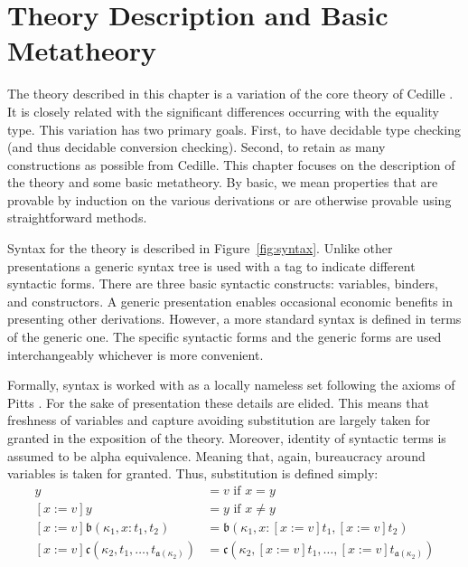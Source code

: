 \chapter{Theory Description and Basic Metatheory}



The theory described in this chapter is a variation of the core theory of Cedille \cite{stump2021_cedillecore}.
It is closely related with the significant differences occurring with the equality type.
This variation has two primary goals.
First, to have decidable type checking (and thus decidable conversion checking).
Second, to retain as many constructions as possible from Cedille.
This chapter focuses on the description of the theory and some basic metatheory.
By basic, we mean properties that are provable by induction on the various derivations or are otherwise provable using straightforward methods.

Syntax for the theory is described in Figure~\ref{fig:syntax}.
Unlike other presentations a generic syntax tree is used with a tag to indicate different syntactic forms.
There are three basic syntactic constructs: variables, binders, and constructors.
A generic presentation enables occasional economic benefits in presenting other derivations.
However, a more standard syntax is defined in terms of the generic one.
The specific syntactic forms and the generic forms are used interchangeably whichever is more convenient.



Formally, syntax is worked with as a locally nameless set following the axioms of Pitts \cite{2023pitts_lns}.
For the sake of presentation these details are elided.
This means that freshness of variables and capture avoiding substitution are largely taken for granted in the exposition of the theory.
Moreover, identity of syntactic terms is assumed to be alpha equivalence.
Meaning that, again, bureaucracy around variables is taken for granted.
Thus, substitution is defined simply:
\begin{align*}
    [x := v]y &= v \text{ if }x = y \\
    [x := v]y &= y \text{ if }x \neq y \\
    [x := v]\mathfrak{b}(\kappa_1, x : t_1, t_2) &= \mathfrak{b}(\kappa_1, x : [x := v]t_1, [x := v]t_2) \\
    [x := v]\mathfrak{c}(\kappa_2, t_1, \ldots, t_{\mathfrak{a}(\kappa_2)}) &= \mathfrak{c}(\kappa_2, [x := v]t_1, \ldots, [x := v]t_{\mathfrak{a}(\kappa_2)})
\end{align*}









